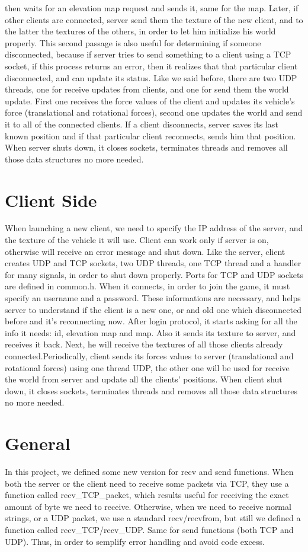 \documentclass{report}
\begin{document}
then waits for an elevation map request and sends it, same for the map.
Later, if other clients are connected, server send them the texture of the new client, and to the latter
the textures of the others, in order to let him initialize his world properly. This second passage is
also useful for determining if someone disconnected, because if server tries to send something to a
client using a TCP socket, if this process returns an error, then it realizes that that particular client
disconnected, and can update its status.
Like we said before, there are two UDP threads, one for receive updates from clients, and one for
send them the world update.
First one receives the force values of the client and updates its vehicle’s force (translational and
rotational forces), second one updates the world and send it to all of the connected clients.
If a client disconnects, server saves its last known position and if that particular client reconnects,
sends him that position.
When server shuts down, it closes sockets, terminates threads and removes all those data structures
no more needed.
\section{Client Side}
When launching a new client, we need to specify the IP address of the server, and the texture of the
vehicle it will use. Client can work only if server is on, otherwise will receive an error message and
shut down. Like the server, client creates UDP and TCP sockets, two UDP threads, one TCP thread
and a handler for many signals, in order to shut down properly. Ports for TCP and UDP sockets are
defined in common.h.
When it connects, in order to join the game, it must specify an username and a password. These
informations are necessary, and helps server to understand if the client is a new one, or and old one
which disconnected before and it’s reconnecting now. After login protocol, it starts asking for all the
info it needs: id, elevation map and map. Also it sends its texture to server, and receives it back.
Next, he will receive the textures of all those clients already connected.Periodically, client sends its forces values to server (translational and rotational forces) using one
thread UDP, the other one will be used for receive the world from server and update all the clients’
positions.
When client shut down, it closes sockets, terminates threads and removes all those data structures
no more needed.
\section{General}
In this project, we defined some new version for recv and send functions. When both the server or
the client need to receive some packets via TCP, they use a function called recv\_TCP\_packet, which
results useful for receiving the exact amount of byte we need to receive. Otherwise, when we need
to receive normal strings, or a UDP packet, we use a standard recv/recvfrom, but still we defined a
function called recv\_TCP/recv\_UDP. Same for send functions (both TCP and UDP). Thus, in order
to semplify error handling and avoid code excess.
\end{document}
